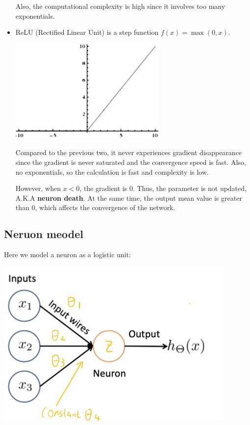 \documentclass[letterpaper,12pt]{article}
\begin{document}
\begin{itemize}
    Also, the computational complexity is high since it involves too many exponentials. 

    \item ReLU (Rectified Linear Unit) is a step function $f(x)=\max(0,x)$.
    
    \includegraphics*{./Image/ReLU function.jpg}

    Compared to the previous two, it never experiences gradient disappearance since the gradient is never saturated and the convergence speed is fast. Also, no exponentials, so the calculation is fast and complexity is low.

    However, when $x<0$, the gradient is 0. Thus, the parameter is not updated, A.K.A \textbf{neuron death}. At the same time, the output mean value is greater than 0, which affects the convergence of the network. 
\end{itemize}

\subsection{Neruon meodel}
Here we model a neuron as a logistic unit:

\includegraphics*{./Image/Nueron Model.jpg}
\end{document}
